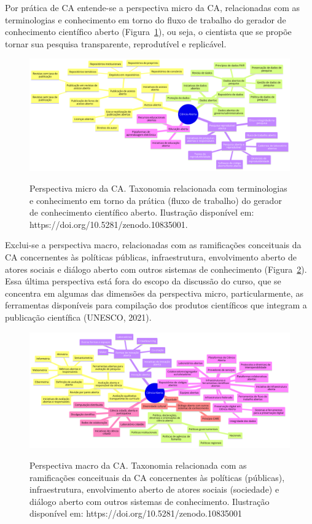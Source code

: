 \documentclass[
  a4paper,
]{book}
\begin{document}
Por prática de CA entende-se a perspectiva micro da CA, relacionadas com
as terminologias e conhecimento em torno do fluxo de trabalho do gerador
de conhecimento científico aberto (Figura~\ref{fig-ca-micro}), ou seja,
o cientista que se propõe tornar sua pesquisa transparente, reprodutível
e replicável.

\begin{figure}

\href{https://doi.org/10.5281/zenodo.10835001}{\includegraphics{img/ca-micro.png}}

\caption{\label{fig-ca-micro}Perspectiva micro da CA. Taxonomia
relacionada com terminologias e conhecimento em torno da prática (fluxo
de trabalho) do gerador de conhecimento científico aberto. Ilustração
disponível em: https://doi.org/10.5281/zenodo.10835001.}

\end{figure}%

Exclui-se a perspectiva macro, relacionadas com as ramificações
conceituais da CA concernentes às políticas públicas, infraestrutura,
envolvimento aberto de atores sociais e diálogo aberto com outros
sistemas de conhecimento (Figura~\ref{fig-ca-macro}). Essa última
perspectiva está fora do escopo da discussão do curso, que se concentra
em algumas das dimensões da perspectiva micro, particularmente, as
ferramentas disponíveis para compilação dos produtos científicos que
integram a publicação científica (UNESCO, 2021).

\begin{figure}

\href{https://doi.org/10.5281/zenodo.10835001}{\includegraphics{img/ca-macro.png}}

\caption{\label{fig-ca-macro}Perspectiva macro da CA. Taxonomia
relacionada com as ramificações conceituais da CA concernentes às
políticas (públicas), infraestrutura, envolvimento aberto de atores
sociais (sociedade) e diálogo aberto com outros sistemas de
conhecimento. Ilustração disponível em:
https://doi.org/10.5281/zenodo.10835001}

\end{figure}%
\end{document}
